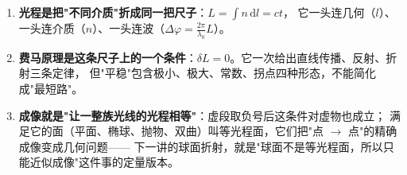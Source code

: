 \documentclass[11pt]{ctexart}
\begin{document}

\begin{enumerate}[label=\textbf{\arabic*.}]
\item \textbf{光程是把"不同介质"折成同一把尺子}：$L=\int n\,\mathrm{d}l=ct$，
它一头连几何（$l$）、一头连介质（$n$）、一头连波（$\Delta\varphi=\frac{2\pi}{\lambda_0}L$）。
\item \textbf{费马原理是这条尺子上的一个条件}：$\delta L=0$。它一次给出直线传播、反射、折射三条定律，
但"平稳"包含极小、极大、常数、拐点四种形态，不能简化成"最短路"。
\item \textbf{成像就是"让一整族光线的光程相等"}：虚段取负号后这条件对虚物也成立；
满足它的面（平面、椭球、抛物、双曲）叫等光程面，它们把"点 $\to$ 点"的精确成像变成几何问题——
下一讲的球面折射，就是"球面不是等光程面，所以只能近似成像"这件事的定量版本。
\end{enumerate}

\end{document}
